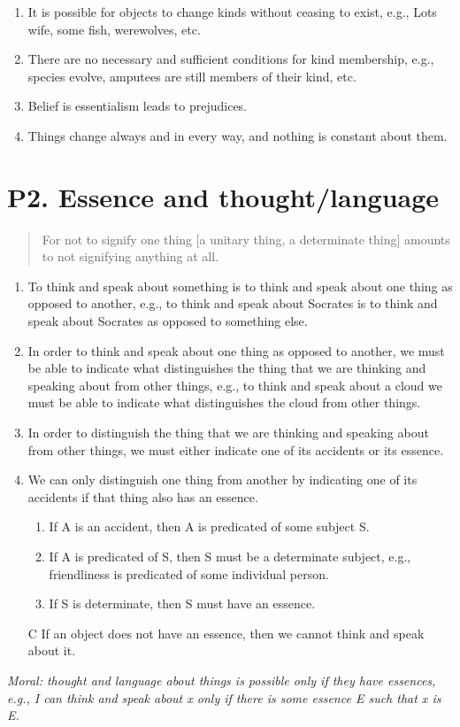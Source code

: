 \documentclass[article,oneside]{memoir}
\begin{document}
\begin{enumerate}
\item It is possible for objects to change kinds without ceasing to exist, e.g., Lots wife, some fish, werewolves, etc.
\item There are no necessary and sufficient conditions for kind membership, e.g., species evolve, amputees are still members of their kind, etc.
\item Belief is essentialism leads to prejudices. 
\item Things change always and in every way, and nothing is constant about them.
\end{enumerate}

\section{P2. Essence and thought/language}

\begin{quotation}
For not to signify one thing [a unitary thing, a determinate thing] amounts to not signifying anything at all.
\end{quotation}


\begin{enumerate}
\item To think and speak about something is to think and speak about one thing as opposed to another, e.g., to think and speak about Socrates is to think and speak about Socrates as opposed to something else. 
\item  In order to think and speak about one thing as opposed to another, we must be able to indicate what distinguishes the thing that we are thinking and speaking about from other things, e.g., to think and speak about a cloud we must be able to indicate what distinguishes the cloud from other things.  
\item In order to distinguish the thing that we are thinking and speaking about from other things, we must either indicate one of its accidents or its essence. 
\item We can only distinguish one thing from another by indicating one of its accidents if that thing also has an essence.   
\begin{enumerate}
\item If A is an accident, then A is predicated of some subject S. 
\item If A is predicated of S, then S must be a determinate subject, e.g., friendliness is predicated of some individual person. 
\item If S is determinate, then S must have an essence. 
\end{enumerate}
\item[C] If an object does not have an essence, then we cannot think and speak about it. 
\end{enumerate}

\noindent \emph{Moral: thought and language about things is possible only if they have essences, e.g., I can think and speak about x only if there is some essence E such that x is E.}
\end{document}
